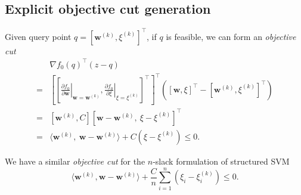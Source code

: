 \subsection{Explicit objective cut generation}
\label{sec:ssvm_objcut}

Given query point $q = \left[ \mathbf{w}^{(k)}, \xi^{(k)} \right]^\top$, if $q$ is feasible, we can form an \emph{objective cut}
\begin{equation}
\label{eq:objcut_1slack}
\begin{aligned}
 & \nabla f_0(q)^\top (z - q) \\
=& \left[ \left[ \left.\frac{\partial f_0}{\partial \mathbf{w}}\right|_{\mathbf{w} = \mathbf{w}^{(k)}}, 
                 \left.\frac{\partial f_0}{\partial \xi}\right|_{\xi = \xi^{(k)}} \right]^\top \right]^\top 
   \left( \left[ \mathbf{w}, \xi \right]^\top - \left[ \mathbf{w}^{(k)}, \xi^{(k)} \right]^\top \right)  \\
=& \left[ \mathbf{w}^{(k)}, C \right] \left[ \mathbf{w} - \mathbf{w}^{(k)},~ \xi - \xi^{(k)} \right]^\top  \\
=& \langle \mathbf{w}^{(k)},~ \mathbf{w} - \mathbf{w}^{(k)} \rangle + C (\xi - \xi^{(k)}) \le 0.
\end{aligned}
\end{equation}

We have a similar \emph{objective cut} for the $n$-slack formulation of structured SVM
\begin{equation}
\label{eq:objcut_nslack}
\langle \mathbf{w}^{(k)}, \mathbf{w} - \mathbf{w}^{(k)} \rangle + \frac{C}{n} \sum_{i=1}^n (\xi_i - \xi_i^{(k)}) \le 0.
\end{equation}


